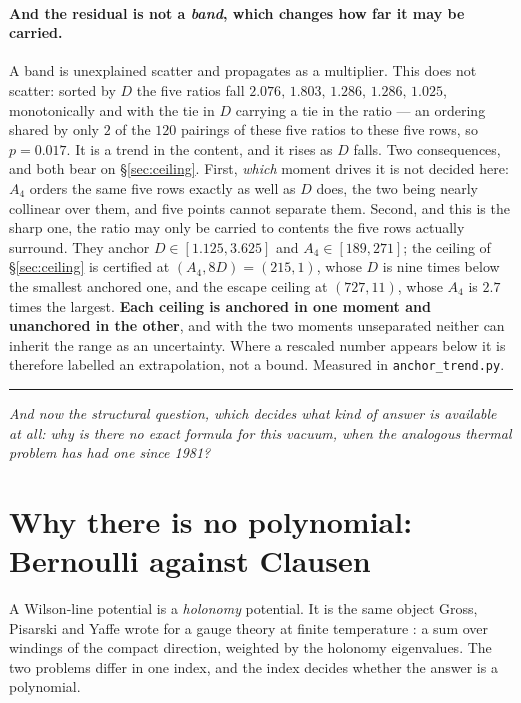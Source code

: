 \documentclass[11pt,a4paper]{article}
\newcommand{\bridge}[1]{\par\medskip\noindent
  \textcolor{hdrblue!45}{\rule{2.2cm}{0.6pt}}\;\;\parbox[t]{0.84\textwidth}{\small\itshape
  \textcolor{hdrblue!85}{#1}}\par\medskip}
\begin{document}
\paragraph{And the residual is not a \emph{band}, which changes how far it may be carried.} A band is unexplained
scatter and propagates as a multiplier. This does not scatter: sorted by $D$ the five ratios fall
$2.076,\,1.803,\,1.286,\,1.286,\,1.025$, monotonically and with the tie in $D$ carrying a tie in the
ratio --- an ordering shared by only $2$ of the $120$ pairings of these five ratios to these five
rows, so $p=0.017$. It is a trend in the content, and it rises as $D$ falls. Two consequences, and
both bear on \S\ref{sec:ceiling}. First, \emph{which} moment drives it is not decided here: $A_4$
orders the same five rows exactly as well as $D$ does, the two being nearly collinear over them, and
five points cannot separate them. Second, and this is the sharp one, the ratio may only be carried
to contents the five rows actually surround. They anchor $D\in[1.125,3.625]$ and
$A_4\in[189,271]$; the ceiling of \S\ref{sec:ceiling} is certified at $(A_4,8D)=(215,1)$, whose $D$
is nine times below the smallest anchored one, and the escape ceiling at $(727,11)$, whose $A_4$ is
$2.7$ times the largest. \textbf{Each ceiling is anchored in one moment and unanchored in the
other}, and with the two moments unseparated neither can inherit the range as an uncertainty.
Where a rescaled number appears below it is therefore labelled an extrapolation, not a bound.
Measured in \texttt{anchor\_trend.py}.

\bridge{And now the structural question, which decides what kind of answer is available at all: why
is there no exact formula for this vacuum, when the analogous thermal problem has had one since 1981?}

\section{Why there is no polynomial: Bernoulli against Clausen}\label{sec:parity}

A Wilson-line potential is a \emph{holonomy} potential. It is the same object Gross, Pisarski and
Yaffe wrote for a gauge theory at finite temperature \cite{GPY}: a sum over windings of the compact
direction, weighted by the holonomy eigenvalues. The two problems differ in one index, and the index
decides whether the answer is a polynomial.
\end{document}
